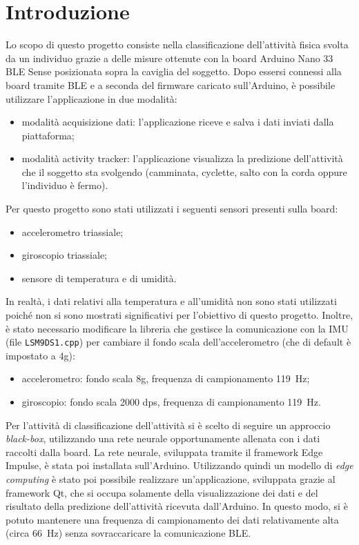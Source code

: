 \section{Introduzione}
Lo scopo di questo progetto consiste nella classificazione dell'attività fisica svolta da un individuo grazie a delle misure ottenute con la board Arduino Nano 33 BLE Sense posizionata sopra la caviglia del soggetto. Dopo essersi connessi alla board tramite BLE e a seconda del firmware caricato sull'Arduino, è possibile utilizzare l'applicazione in due modalità:
\begin{itemize}
	\item modalità acquisizione dati: l'applicazione riceve e salva i dati inviati dalla piattaforma;
	\item modalità activity tracker: l'applicazione visualizza la predizione dell'attività che il soggetto sta svolgendo (camminata, cyclette, salto con la corda oppure l'individuo è fermo).
\end{itemize}
Per questo progetto sono stati utilizzati i seguenti sensori presenti sulla board:
\begin{itemize}
	\item accelerometro triassiale; 
	\item giroscopio triassiale;
	\item sensore di temperatura e di umidità.
\end{itemize}
In realtà, i dati relativi alla temperatura e all'umidità non sono stati utilizzati poiché non si sono mostrati significativi per l'obiettivo di questo progetto. Inoltre, è stato necessario modificare la libreria che gestisce la comunicazione con la IMU (file \texttt{LSM9DS1.cpp}) per cambiare il fondo scala dell'accelerometro (che di default è impostato a 4g):
\begin{itemize}
	\item accelerometro: fondo scala 8g, frequenza di campionamento \SI{119}{\hertz};
	\item giroscopio: fondo scala 2000 dps, frequenza di campionamento \SI{119}{\hertz}.
\end{itemize}

\noindent
Per l'attività di classificazione dell'attività si è scelto di seguire un approccio \textit{black-box}, utilizzando una rete neurale opportunamente allenata con i dati raccolti dalla board. La rete neurale, sviluppata tramite il framework Edge Impulse, è stata poi installata sull'Arduino. Utilizzando quindi un modello di \textit{edge computing} è stato poi possibile realizzare un'applicazione, sviluppata grazie al framework Qt, che si occupa solamente della visualizzazione dei dati e del risultato della predizione dell'attività ricevuta dall'Arduino. In questo modo, si è potuto mantenere una frequenza di campionamento dei dati relativamente alta (circa \SI{66}{\hertz}) senza sovraccaricare la comunicazione BLE.

